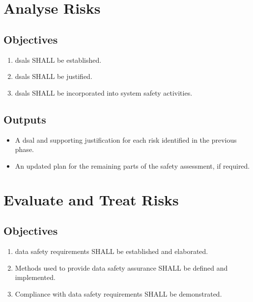 \section{Analyse Risks}
\subsection{Objectives}
\begin{enumerate}[label=\color{dsiwgAccentColour}{3-\arabic*}]
	\item \Glspl{dsal} SHALL be established.
	\item \Glspl{dsal} SHALL be justified.
	\item \Glspl{dsal} SHALL be incorporated into system safety activities.
\end{enumerate}

\subsection{Outputs}
\begin{itemize}
	\item A \gls{dsal} and supporting justification for each risk identified in the previous phase.
	\item An updated plan for the remaining parts of the \gls{safety assessment}, if required.
\end{itemize}

\section{Evaluate and Treat Risks}
\subsection{Objectives}
\begin{enumerate}[label=\color{dsiwgAccentColour}{4-\arabic*}]
	\item {}\Glspl{data safety requirement} SHALL be established and elaborated.
	\item Methods used to provide data safety assurance SHALL be defined and implemented.
	\item Compliance with \glspl{data safety requirement} SHALL be demonstrated.	
\end{enumerate}

